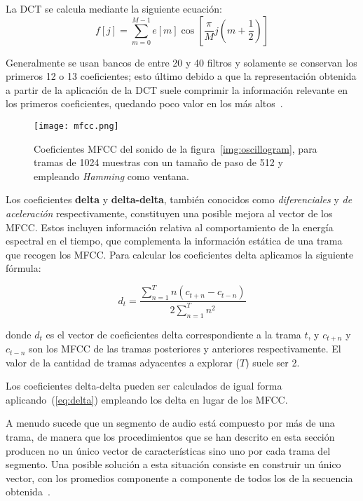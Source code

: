 La DCT se calcula mediante la siguiente ecuación:
\begin{equation}
    \label{eq:DCT}
    f[j] = \sum_{m=0}^{M-1}{e[m]\cos{\left[ \frac{\pi}{M}j\left( m + \frac{1}{2} \right) \right]}}
\end{equation}

Generalmente se usan bancos de entre 20 y 40 filtros y solamente se conservan los primeros 12 o 13 coeficientes;
esto último debido a que la representación obtenida a partir de la aplicación de la DCT suele comprimir la información relevante en los primeros coeficientes, quedando poco valor en los más altos~\cite{Davis80}.

\begin{figure}[!h]
    \centering
    \texttt{[image: mfcc.png]}
    \caption{Coeficientes MFCC del sonido de la figura~\ref{img:oscillogram}, para tramas de 1024 muestras con un tamaño de paso de 512 y empleando \textit{Hamming} como ventana.}
    \label{img:mfcc}
\end{figure}

Los coeficientes \textbf{delta} y \textbf{delta-delta}, también conocidos como \textit{diferenciales} y \textit{de aceleración} respectivamente,
constituyen una posible mejora al vector de los MFCC.
Estos incluyen información relativa al comportamiento de la energía espectral en el tiempo, que complementa la información estática de una trama que recogen los MFCC.
Para calcular los coeficientes delta aplicamos la siguiente fórmula:

\begin{equation}
    \label{eq:delta}
    d_t = \frac{\sum_{n=1}^{T}{n(c_{t+n} - c_{t-n})}}{2\sum_{n=1}^{T}{n^2}}
\end{equation}

\noindent
donde $d_t$ es el vector de coeficientes delta correspondiente a la trama $t$, y $c_{t+n}$ y $c_{t-n}$ son los MFCC de las tramas posteriores y anteriores respectivamente.
El valor de la cantidad de tramas adyacentes a explorar ($T$) suele ser 2.

Los coeficientes delta-delta pueden ser calculados de igual forma aplicando~(\ref{eq:delta}) empleando los delta en lugar de los MFCC.

A menudo sucede que un segmento de audio está compuesto por más de una trama, de manera que los procedimientos que se han descrito en esta sección producen no un único vector de características sino uno por cada trama del segmento.
Una posible solución a esta situación consiste en construir un único vector, con los promedios componente a componente de todos los de la secuencia obtenida~\cite{Lee06,Fagerlund07}.